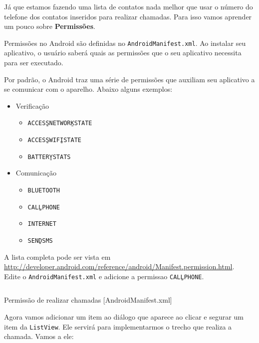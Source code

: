 Já que estamos fazendo uma lista de contatos nada melhor que usar o número do telefone dos
contatos inseridos para realizar chamadas. Para isso vamos aprender um pouco sobre \textbf{Permissões}.

Permissões no Android são definidas no \texttt{AndroidManifest.xml}. Ao instalar seu aplicativo,
o usuário saberá quais as permissões que o seu aplicativo necessita para ser executado.

Por padrão, o Android traz uma série de permissões que auxiliam seu aplicativo a se comunicar com
o aparelho. Abaixo alguns exemplos:

\begin{itemize}
\item Verificação
\begin{itemize}
  \item \texttt{ACCESS\b{ }NETWORK\b{ }STATE}
  \item \texttt{ACCESS\b{ }WIFI\b{ }STATE}
  \item \texttt{BATTERY\b{ }STATS}
\end{itemize}

\item Comunicação
\begin{itemize}
  \item \texttt{BLUETOOTH}
  \item \texttt{CALL\b{ }PHONE}
  \item \texttt{INTERNET}
  \item \texttt{SEND\b{ }SMS}
\end{itemize}

\end{itemize}

A lista completa pode ser vista em 
\url{http://developer.android.com/reference/android/Manifest.permission.html}.\\

Edite o \texttt{AndroidManifest.xml} e adicione a permissao \texttt{CALL\b{ }PHONE}.

\begin{listing}[H]
  \inputminted[linenos=true,frame=bottomline,tabsize=3]{ xml }{ source/AndroidManifest-3.xml }
  \caption{Permissão de realizar chamadas [AndroidManifest.xml]}
\end{listing}

Agora vamos adicionar um item ao diálogo que aparece ao clicar e segurar um item da \texttt{ListView}.
Ele servirá para implementarmos o trecho que realiza a chamada. Vamos a ele:

